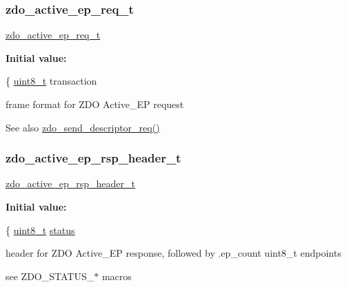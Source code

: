 \subsubsection{\texorpdfstring{zdo\+\_\+active\+\_\+ep\+\_\+req\+\_\+t}{zdo\_active\_ep\_req\_t}}
{\footnotesize\ttfamily \hyperlink{group__zdo_ga54a6580e6f7572ca6014963d3e03e735}{zdo\+\_\+active\+\_\+ep\+\_\+req\+\_\+t}}

{\bfseries Initial value\+:}
\begin{DoxyCode}
\{
   \hyperlink{group__hal__dos_gae1affc9ca37cfb624959c866a73f83c2}{uint8\_t}    transaction
\end{DoxyCode}


frame format for Z\+DO Active\+\_\+\+EP request 

\begin{DoxySeeAlso}{See also}
\hyperlink{group__zdo_gac842062e5e1a60d25cddf16ec22ef601}{zdo\+\_\+send\+\_\+descriptor\+\_\+req()} 
\end{DoxySeeAlso}
\mbox{\label{group__zdo_ga47a4305044809f1e37b1a88c3232676a}} 
\subsubsection{\texorpdfstring{zdo\+\_\+active\+\_\+ep\+\_\+rsp\+\_\+header\+\_\+t}{zdo\_active\_ep\_rsp\_header\_t}}
{\footnotesize\ttfamily \hyperlink{group__zdo_ga47a4305044809f1e37b1a88c3232676a}{zdo\+\_\+active\+\_\+ep\+\_\+rsp\+\_\+header\+\_\+t}}

{\bfseries Initial value\+:}
\begin{DoxyCode}
\{
   \hyperlink{group__hal__dos_gae1affc9ca37cfb624959c866a73f83c2}{uint8\_t}    \hyperlink{group__xbee__atcmd_gade818037fd6c985038ff29656089758d}{status}
\end{DoxyCode}


header for Z\+DO Active\+\_\+\+EP response, followed by {\ttfamily }.ep\+\_\+count uint8\+\_\+t endpoints 

see Z\+D\+O\+\_\+\+S\+T\+A\+T\+U\+S\+\_\+$\ast$ macros \mbox{\label{group__zdo_ga68c283a043714a9e40d3674146dd6239}} 
